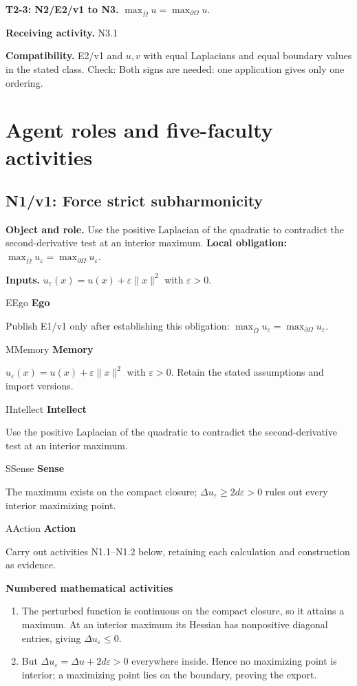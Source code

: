 \documentclass[preprint,12pt,aps,pra,showkeys,amsmath,amssymb,superscriptaddress,floatfix]{revtex4-2}
\theoremstyle{definition}
\theoremstyle{remark}
\newcommand{\mmfaculty}[3]{%
 \begin{mmfacultybox}{#1}{#2}
 {\sffamily\bfseries\color{MMBlue}#2}\par\smallskip #3
 \end{mmfacultybox}}
\newcommand{\field}[2]{\par\smallskip\noindent\textbf{#1.} #2\par}
\begin{document}
\field{T2-3: N2/E2/v1 to N3}{\(\max_{\overline\Omega}u=\max_{\partial\Omega}u\).}

\field{Receiving activity}{N3.1}

\field{Compatibility}{E2/v1 and \(u,v\) with equal Laplacians and equal boundary values in the
stated class. Check: Both signs are needed: one application gives only
one ordering.}

\endgroup

\clearpage\section{Agent roles and five-faculty activities}\begingroup\small\linespread{1.05}\selectfont{}

\subsection{N1/v1: Force strict subharmonicity}

\field{Object and role}{Use the positive Laplacian of the quadratic to contradict the
second-derivative test at an interior maximum. \textbf{Local
obligation:}
\(\max_{\overline\Omega}u_\varepsilon=\max_{\partial\Omega}u_\varepsilon\).}

\field{Inputs}{\(u_\varepsilon(x)=u(x)+\varepsilon\|x\|^2\) with \(\varepsilon>0\).}

\mmfaculty{E}{Ego}{Publish E1/v1 only after establishing this obligation:
\(\max_{\overline\Omega}u_\varepsilon=\max_{\partial\Omega}u_\varepsilon\).}

\mmfaculty{M}{Memory}{\(u_\varepsilon(x)=u(x)+\varepsilon\|x\|^2\) with \(\varepsilon>0\).
Retain the stated assumptions and import versions.}

\mmfaculty{I}{Intellect}{Use the positive Laplacian of the quadratic to contradict the
second-derivative test at an interior maximum.}

\mmfaculty{S}{Sense}{The maximum exists on the compact closure;
\(\Delta u_\varepsilon\ge2d\varepsilon>0\) rules out every interior
maximizing point.}

\mmfaculty{A}{Action}{Carry out activities N1.1--N1.2 below, retaining each calculation and
construction as evidence.}

\smallskip\noindent\textbf{Numbered mathematical activities}

\begin{enumerate}[label=N1.\arabic*,leftmargin=3.4em]

\item The perturbed function is continuous on the compact closure, so it
attains a maximum. At an interior maximum its Hessian has nonpositive
diagonal entries, giving \(\Delta u_\varepsilon\le0\).

\item But \(\Delta u_\varepsilon=\Delta u+2d\varepsilon>0\) everywhere inside.
Hence no maximizing point is interior; a maximizing point lies on the
boundary, proving the export.

\end{enumerate}
\end{document}
